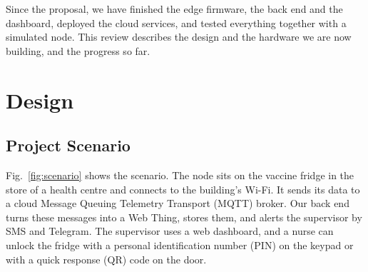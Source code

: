 \documentclass[conference,12pt]{IEEEtran}
\begin{document}
Since the proposal, we have finished the edge firmware, the back end and the dashboard, deployed
the cloud services, and tested everything together with a simulated node. This review describes
the design and the hardware we are now building, and the progress so far.

\section{Design}

\subsection{Project Scenario}

Fig.~\ref{fig:scenario} shows the scenario. The node sits on the vaccine fridge in the store of a
health centre and connects to the building's Wi-Fi. It sends its data to a cloud Message Queuing
Telemetry Transport (MQTT) broker. Our back end turns these messages into a Web Thing, stores
them, and alerts the supervisor by SMS and Telegram. The supervisor uses a web dashboard, and a
nurse can unlock the fridge with a personal identification number (PIN) on the keypad or with a
quick response (QR) code on the door.
\end{document}
